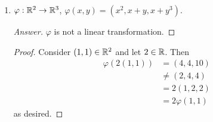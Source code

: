 \documentclass[../main.tex]{subfiles}
\begin{document}
\begin{exercise}
\begin{enumerate}[label={(\alph*)}]
\begin{proof}[Answer]
        \end{proof}
        \begin{proof}
            To prove that $\varphi$ is a linear transformation, Definition \ref{dfn:19.1} tells us that it will suffice to show that for any $\x,\y\in\R^2$ and for any $\lambda\in\R$, $\varphi(\x+\y)=\varphi(\x)+\varphi(\y)$ and $\varphi(\lambda\x)=\lambda\varphi(\x)$. Let $\x,\y$ be arbitrary elements of $\R^2$, and let $\lambda$ be an arbitrary element of $\R$. Then
            \begin{align*}
                \varphi(\x+\y) &= (3[x_1+y_1]-[x_2+y_2],[x_1+y_1]+2[x_2+y_2],0)\\
                &= ([3x_1-x_2]+[3y_1-y_2],[x_1+2x_2]+[y_1+2y_1],0)\\
                &= (3x_1-x_2,x_1+2x_2,0)+(3y_1-y_2,y_1+2y_2,0)\\
                &= \varphi(\x)+\varphi(\y)
            \end{align*}
            and
            \begin{align*}
                \varphi(\lambda\x) &= (3[\lambda x_1]-[\lambda x_2],[\lambda x_1]+2[\lambda x_2],0)\\
                &= (\lambda[3x_1-x_2],\lambda[x_1+2x_2],0)\\
                &= \lambda(3x_1-x_2,x_1+2x_2,0)\\
                &= \lambda\varphi(\x)
            \end{align*}
            as desired.
        \end{proof}
        \item $\varphi:\mathbb{R}^2\to\mathbb{R}^3$, $\varphi(x,y)=(x^2,x+y,x+y^3)$.
        \begin{proof}[Answer]
            $\varphi$ is not a linear transformation.
        \end{proof}
        \begin{proof}
            Consider $(1,1)\in\mathbb{R}^2$ and let $2\in\mathbb{R}$. Then
            \begin{align*}
                \varphi(2(1,1)) &= (4,4,10)\\
                &\neq (2,4,4)\\
                &= 2(1,2,2)\\
                &= 2\varphi(1,1)
            \end{align*}
            as desired.
        \end{proof}
    \end{enumerate}
\end{exercise}
\end{document}
